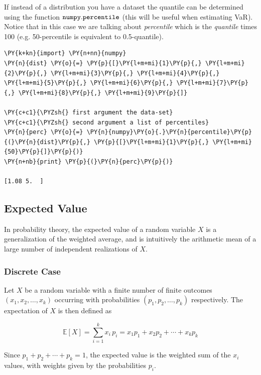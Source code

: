 If instead of a distribution you have a dataset the quantile can be
determined using the function \(\tt{numpy.percentile}\) (this will be
useful when estimating VaR). Notice that in this case we are talking
about \emph{percentile} which is the \emph{quantile} times 100
(e.g. 50-percentile is equivalent to 0.5-quantile).

\begin{codebox}
\begin{Verbatim}[commandchars=\\\{\}]
\PY{k+kn}{import} \PY{n+nn}{numpy}
\PY{n}{dist} \PY{o}{=} \PY{p}{[}\PY{l+m+mi}{1}\PY{p}{,} \PY{l+m+mi}{2}\PY{p}{,} \PY{l+m+mi}{3}\PY{p}{,} \PY{l+m+mi}{4}\PY{p}{,} \PY{l+m+mi}{5}\PY{p}{,} \PY{l+m+mi}{6}\PY{p}{,} \PY{l+m+mi}{7}\PY{p}{,} \PY{l+m+mi}{8}\PY{p}{,} \PY{l+m+mi}{9}\PY{p}{]}
		
\PY{c+c1}{\PYZsh{} first argument the data-set}
\PY{c+c1}{\PYZsh{} second argument a list of percentiles}
\PY{n}{perc} \PY{o}{=} \PY{n}{numpy}\PY{o}{.}\PY{n}{percentile}\PY{p}{(}\PY{n}{dist}\PY{p}{,} \PY{p}{[}\PY{l+m+mi}{1}\PY{p}{,} \PY{l+m+mi}{50}\PY{p}{]}\PY{p}{)}		
\PY{n+nb}{print} \PY{p}{(}\PY{n}{perc}\PY{p}{)}
		
[1.08 5.  ]
\end{Verbatim}
\end{codebox}

\subsection{Expected Value}\label{sec:expected-value}

In probability theory, the expected value of a random variable \(X\) is
a generalization of the weighted average, and is intuitively the
arithmetic mean of a large number of independent realizations of \(X\).

\subsubsection{Discrete Case}
Let \(X\) be a random variable with a finite number of finite outcomes
\((x_{1},x_{2},\ldots ,x_{k})\) occurring with probabilities
\((p_{1},p_{2},\ldots ,p_{k})\) respectively. The expectation of \(X\)
is then defined as

\begin{equation}
	\mathbb{E}[X]=\sum _{i=1}^{k}x_{i}\,p_{i}=x_{1}p_{1}+x_{2}p_{2}+\cdots +x_{k}p_{k}
\end{equation}

Since \(p_{1}+p_{2}+\cdots +p_{k}=1\), the expected value is the
weighted sum of the \(x_{i}\) values, with weights given by 
the probabilities \(p_{i}\).

